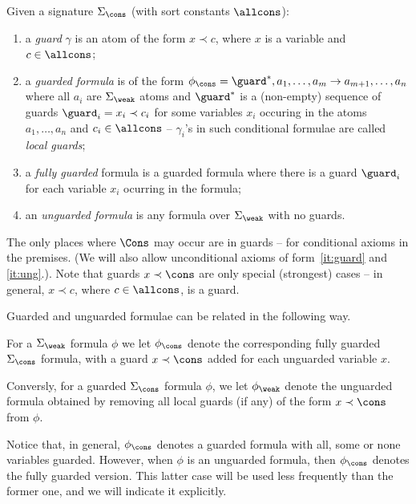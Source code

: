 \begin{definition}\label{def:guf}
Given a signature  $\Sigma_\cons$ (with sort constants $\allcons$):
\begin{enumerate}\MyLPar
\item\label{it:guard} a {\em guard} $\gamma$ is an atom of the form $x \prec c$, where
$x$ is a variable and $c \in \allcons$;
\item a {\em guarded formula} is of the form $\phi_\cons = \guard^{\ast},
	a_1, \ldots ,a_m \to a_{m+1}, \ldots ,a_n$ where all $a_i$ are
	${\Sigma_\weak}$ atoms and 
	$\guard^\ast$ is a (non-empty) sequence of guards $\guard_i =
	x_i\prec {c_{i}}$ for some variables $x_i$ occuring in the
	atoms $a_1, \ldots ,a_n$ and $c_i\in\allcons$ -- $\gamma_i$'s in such conditional
	formulae are called {\em local guards};
\item a {\em fully guarded} formula is a guarded formula where there is a
guard $\guard_i$ for each variable $x_i$ ocurring in the formula;
\item\label{it:ung} an {\em unguarded formula} is any formula over $\Sigma_\weak$
with no guards.
\end{enumerate}
\end{definition}
The only places where $\Cons$ may occur are in guards
-- for conditional axioms in the premises. (We will also allow unconditional
axioms of form~\ref{it:guard} and \ref{it:ung}.). Note that guards $x\prec\cons$ are only special
(strongest) cases -- in general, $x\prec c$, where $c\in\allcons$, is a
guard. 

Guarded and unguarded formulae can be related in the following way.

\begin{definition}
For a $\Sigma_\weak$ formula $\phi$ we let $\phi_\cons$ denote the
corresponding fully guarded $\Sigma_\cons$ formula, with a guard
$x\prec\cons$ added for each unguarded variable $x$.

Conversly, for a guarded $\Sigma_\cons$ formula $\phi$, we let $\phi_\weak$
denote the unguarded formula obtained by removing all local guards (if any) of the
form $x\prec\cons$ from $\phi$.
\end{definition}
%
Notice that, in general, $\phi_\cons$ denotes a guarded formula with all,
some or none variables guarded. However, when $\phi$ is an unguarded formula,
then $\phi_\cons$ denotes the fully guarded version. This latter case will be
used less frequently than the former one, and we will indicate it explicitly.



